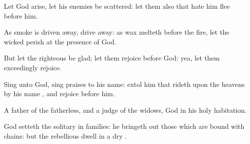 {\Q {}Let
God
arise, let his
enemies be
scattered: let them also that
hate him
flee
before him.


\par }{\Q {}As
smoke is driven
away,
{} drive
{}
away: as
wax
melteth
before the
fire,
{} let the
wicked
perish at the
presence of
God.


\par }{\Q {}But let the
righteous be
glad; let them
rejoice
before
God: yea, let them
exceedingly
rejoice.


\par }{\Q {}Sing unto
God, sing
praises to his
name:
extol him that
rideth upon the
heavens by his
name
{}, and
rejoice
before him.


\par }{\Q {}A
father of the
fatherless, and a
judge of the
widows,
{}
God in his
holy
habitation.


\par }{\Q {}God
setteth the
solitary in
families: he bringeth
out those which are
bound with
chains: but the
rebellious
dwell in a
dry
{}.


\par }{\BB \par }
